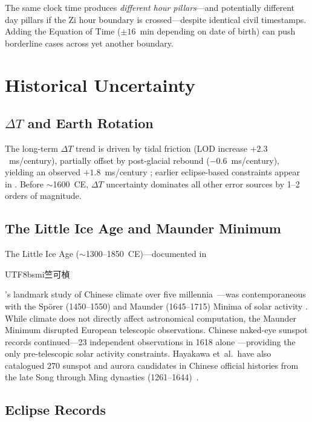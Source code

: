 \documentclass[10pt,a4paper]{article}
\newcommand{\zh}[1]{\begin{CJK}{UTF8}{bsmi}#1\end{CJK}}
\begin{document}
\noindent
The same clock time produces \emph{different hour pillars}---and potentially
different day pillars if the Zi hour boundary is crossed---despite
identical civil timestamps. Adding the Equation of Time ($\pm 16$~min
depending on date of birth) can push borderline cases across yet another
boundary.


\section{Historical Uncertainty}
\label{sec:uncertainty}

\subsection{$\Delta T$ and Earth Rotation}
\label{subsec:deltaT}

The long-term $\Delta T$ trend is driven by tidal friction (LOD increase
$+2.3$~ms/century), partially offset by post-glacial rebound
($-0.6$~ms/century), yielding an observed $+1.8$~ms/century
\cite{stephenson2016}; earlier eclipse-based constraints appear in
\cite{stephenson1986}. Before $\sim$1600~CE, $\Delta T$ uncertainty
dominates all other error sources by 1--2 orders of magnitude.

\subsection{The Little Ice Age and Maunder Minimum}

The Little Ice Age ($\sim$1300--1850~CE)---documented in
\zh{竺可楨}'s landmark study of Chinese climate over five
millennia~\cite{zhukz1973}---was contemporaneous with the Sp\"{o}rer
(1450--1550) and Maunder (1645--1715) Minima of solar activity
\cite{eddy1976}. While climate does not directly affect astronomical
computation, the Maunder Minimum disrupted European telescopic observations.
Chinese naked-eye sunspot records continued---23 independent observations in
1618 alone \cite{hayakawa2022}---providing the only pre-telescopic solar
activity constraints. Hayakawa et~al.\ have also catalogued 270 sunspot
and aurora candidates in Chinese official histories from the late Song
through Ming dynasties (1261--1644)~\cite{hayakawa2017}.

\subsection{Eclipse Records}
\end{document}
